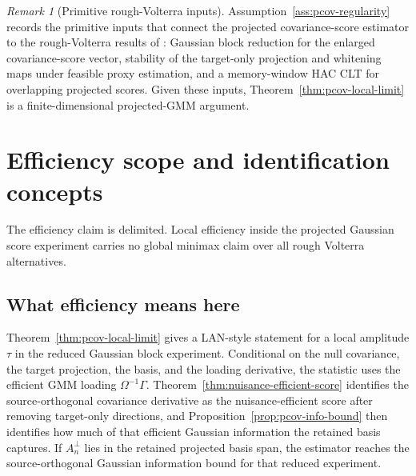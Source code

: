 \documentclass[11pt,a4paper]{amsart}
\theoremstyle{plain}
\theoremstyle{definition}
\theoremstyle{remark}
\newtheorem{remark}[theorem]{Remark}
\begin{document}
\begin{remark}[Primitive rough-Volterra inputs]
Assumption~\ref{ass:pcov-regularity} records the primitive inputs that connect the projected
covariance-score estimator to the rough-Volterra results of
\cite{vidal2026latent,vidal2026dynamic}: Gaussian block reduction for the enlarged covariance-score
vector, stability of the target-only projection and whitening maps under feasible proxy estimation,
and a memory-window HAC CLT for overlapping projected scores.  Given these inputs,
Theorem~\ref{thm:pcov-local-limit} is a finite-dimensional projected-GMM argument.
\end{remark}


\section{Efficiency scope and identification concepts}\label{sec:scope-pq-rough}

The efficiency claim is delimited.  Local efficiency inside the projected Gaussian score experiment
carries no global minimax claim over all rough Volterra alternatives.

\subsection{What efficiency means here}

Theorem~\ref{thm:pcov-local-limit} gives a LAN-style statement for a local amplitude \(\tau\) in the
reduced Gaussian block experiment.  Conditional on the null covariance, the target projection, the
basis, and the loading derivative, the statistic uses the efficient GMM loading
\(\Omega^{-1}\Gamma\).  Theorem~\ref{thm:nuisance-efficient-score} identifies the source-orthogonal
covariance derivative as the nuisance-efficient score after removing target-only directions, and
Proposition~\ref{prop:pcov-info-bound} then identifies how much of that efficient Gaussian
information the retained basis captures.  If
\(A_n^\perp\) lies in the retained projected basis span, the estimator reaches the source-orthogonal
Gaussian information bound for that reduced experiment.
\end{document}
